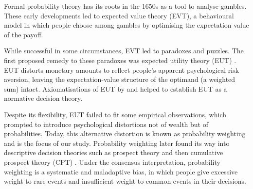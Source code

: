 \documentclass[a4paper, 12pt]{article}
\newcommand{\ie}{\textit{i.e.}\xspace}
\begin{document}
Formal probability theory has its roots in the 1650s as a tool to analyse gambles. These early developments led to expected value theory (EVT), a behavioural model in which people choose among gambles by optimising the expectation value of the payoff.


While successful in some circumstances, EVT led to paradoxes and puzzles. The first proposed remedy to these paradoxes was expected utility theory (EUT) \parencite{Bernoulli1738,Laplace1814}.
EUT distorts monetary amounts to reflect people's apparent psychological risk aversion, leaving the expectation-value structure of the optimand (a weighted sum) intact.
Axiomatisations of EUT by \textcite{vonNeumannMorgenstern1944} and \textcite{Savage1954} helped to establish EUT as a normative decision theory.

Despite its flexibility, EUT failed to fit some empirical observations, which prompted \textcite{PrestonBaratta1948}
to introduce psychological distortions not of wealth but of probabilities.
Today, this alternative distortion is known as probability weighting and is the focus of our study.
Probability weighting later found its way into descriptive decision theories such as prospect theory \parencite{KahnemanTversky1979} and then cumulative prospect theory (CPT) \parencite{TverskyKahneman1992}.
Under the consensus interpretation, probability weighting is a systematic and maladaptive bias, in which people give excessive weight to rare events and insufficient weight to common events in their decisions.
\end{document}

